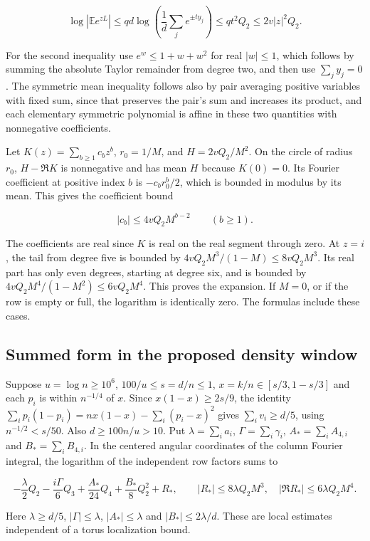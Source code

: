 \documentclass[11pt]{article}
\begin{document}
\[
\log|\mathbb E e^{zL}|
\le qd\log\left(\frac1d\sum_j e^{\pm t y_j}\right)
\le q t^2 Q_2
\le 2v |z|^2 Q_2.
\]

For the second inequality use $e^w\le1+w+w^2$ for real $|w|\le1$,
which follows by summing the absolute Taylor remainder from degree
two, and then use $\sum_j y_j=0$. The symmetric mean inequality
follows also by pair averaging positive variables with fixed sum,
since that preserves the pair's sum and increases its product,
and each elementary symmetric polynomial is affine in these two
quantities with nonnegative coefficients.

Let $K(z)=\sum_{b\ge1}c_bz^b$, $r_0=1/M$, and
$H=2vQ_2/M^2$. On the circle of radius $r_0$,
$H-\Re K$ is nonnegative and has mean $H$ because $K(0)=0$.
Its Fourier coefficient at positive index $b$ is
$-c_b r_0^b/2$, which is bounded in modulus by its mean.
This gives the coefficient bound

\[
|c_b|\le 4vQ_2 M^{b-2}\qquad(b\ge1).
\]

The coefficients are real since $K$ is real on the real segment
through zero. At $z=i$, the tail from degree five is bounded by
$4vQ_2M^3/(1-M)\le8vQ_2M^3$. Its real part has only even
degrees, starting at degree six, and is bounded by
$4vQ_2M^4/(1-M^2)\le6vQ_2M^4$. This proves the expansion.
If $M=0$, or if the row is empty or full, the logarithm is
identically zero. The formulas include these cases.

\subsection{Summed form in the proposed density window}

Suppose $u=\log n\ge10^6$, $100/u\le s=d/n\le1$, $x=k/n\in[s/3,1-s/3]$ and each $p_i$ is within $n^{-1/4}$ of $x$. Since $x(1-x)\ge2s/9$, the identity $\sum_i p_i(1-p_i)=nx(1-x)-\sum_i(p_i-x)^2$ gives $\sum_i v_i\ge d/5$, using $n^{-1/2}<s/50$. Also $d\ge100n/u>10$.
Put $\lambda=\sum_i a_i$, $\Gamma=\sum_i\gamma_i$,
$A_{\ast}=\sum_i A_{4,i}$ and $B_{\ast}=\sum_i B_{4,i}$.
In the centered angular coordinates of the column Fourier integral,
the logarithm of the independent row factors sums to

\[
-\frac{\lambda}{2}Q_2-\frac{i\Gamma}{6}Q_3+
\frac{A_{\ast}}{24}Q_4+\frac{B_{\ast}}{8}Q_2^2+R_{\ast},
\qquad |R_{\ast}|\le8\lambda Q_2M^3,\quad
|\Re R_{\ast}|\le6\lambda Q_2 M^4 .
\]

Here $\lambda\ge d/5$, $|\Gamma|\le\lambda$,
$|A_{\ast}|\le\lambda$ and $|B_{\ast}|\le2\lambda/d$.
These are local estimates independent of a torus localization bound.
\end{document}

